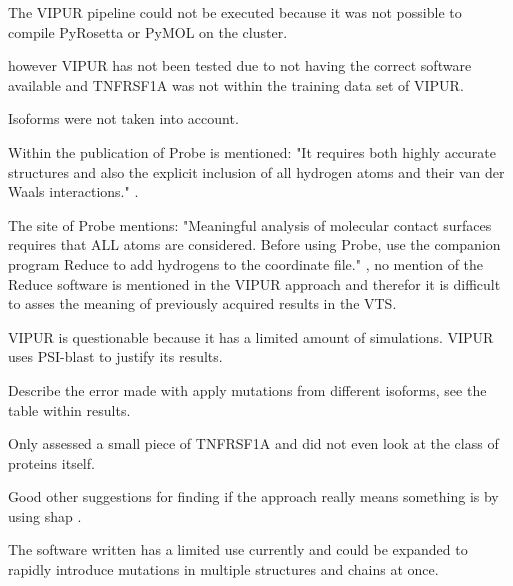 The VIPUR pipeline could not be executed because it was not possible to compile PyRosetta or PyMOL on the cluster.

however VIPUR has not been tested due to not having the correct software available and TNFRSF1A was not within the training data set of VIPUR. 

Isoforms were not taken into account.

Within the publication of Probe is mentioned: "It requires both highly accurate structures and also the explicit inclusion of all hydrogen atoms and their van der Waals interactions." \cite{}.

The site of Probe mentions: "Meaningful analysis of molecular contact surfaces requires that ALL atoms are considered. Before using Probe, use the companion program Reduce to add hydrogens to the coordinate file." \cite{}, no mention of the Reduce software is mentioned in the VIPUR approach and therefor it is difficult to asses the meaning of previously acquired results in the VTS.

VIPUR is questionable because it has a limited amount of simulations.
VIPUR uses PSI-blast to justify its results.

Describe the error made with apply mutations from different isoforms, see the table within results.

Only assessed a small piece of TNFRSF1A and did not even look at the class of proteins itself.


Good other suggestions for finding if the approach really means something is by using shap \cite{}.

The software written has a limited use currently and could be expanded to rapidly introduce mutations in multiple structures and chains at once.

